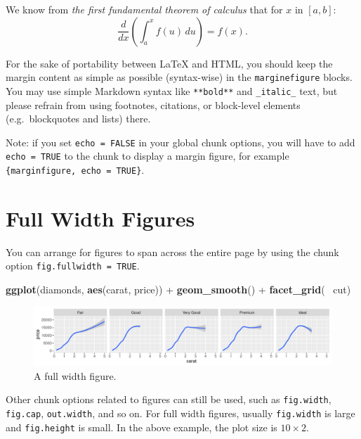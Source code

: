 \documentclass[]{tufte-book}
\newenvironment{Shaded}{}{}
\newcommand{\KeywordTok}[1]{\textcolor[rgb]{0.00,0.44,0.13}{\textbf{#1}}}
\newcommand{\NormalTok}[1]{#1}
\newcommand{\OperatorTok}[1]{\textcolor[rgb]{0.40,0.40,0.40}{#1}}
\newcommand{\StringTok}[1]{\textcolor[rgb]{0.25,0.44,0.63}{#1}}
\begin{document}
\begin{marginfigure}
We know from \emph{the first fundamental theorem of calculus} that for
\(x\) in \([a, b]\):
\[\frac{d}{dx}\left( \int_{a}^{x} f(u)\,du\right)=f(x).\]
\end{marginfigure}

For the sake of portability between LaTeX and HTML, you should keep the
margin content as simple as possible (syntax-wise) in the
\texttt{marginefigure} blocks. You may use simple Markdown syntax like
\texttt{**bold**} and \texttt{\_italic\_} text, but please refrain from
using footnotes, citations, or block-level elements (e.g.~blockquotes
and lists) there.

Note: if you set \texttt{echo\ =\ FALSE} in your global chunk options,
you will have to add \texttt{echo\ =\ TRUE} to the chunk to display a
margin figure, for example
\texttt{\textasciigrave{}\textasciigrave{}\textasciigrave{}\{marginfigure,\ echo\ =\ TRUE\}}.

\hypertarget{full-width-figures}{%
\section{Full Width Figures}\label{full-width-figures}}

You can arrange for figures to span across the entire page by using the
chunk option \texttt{fig.fullwidth\ =\ TRUE}.

\begin{Shaded}
\begin{Highlighting}[]
\KeywordTok{ggplot}\NormalTok{(diamonds, }\KeywordTok{aes}\NormalTok{(carat, price)) }\OperatorTok{+}\StringTok{ }\KeywordTok{geom_smooth}\NormalTok{() }\OperatorTok{+}
\StringTok{  }\KeywordTok{facet_grid}\NormalTok{(}\OperatorTok{~}\StringTok{ }\NormalTok{cut)}
\end{Highlighting}
\end{Shaded}

\begin{figure}
\includegraphics{deleteme_files/figure-latex/fig-fullwidth-1} \caption[A full width figure]{A full width figure.}\label{fig:fig-fullwidth}
\end{figure}

Other chunk options related to figures can still be used, such as
\texttt{fig.width}, \texttt{fig.cap}, \texttt{out.width}, and so on. For
full width figures, usually \texttt{fig.width} is large and
\texttt{fig.height} is small. In the above example, the plot size is
\(10 \times 2\).
\end{document}
